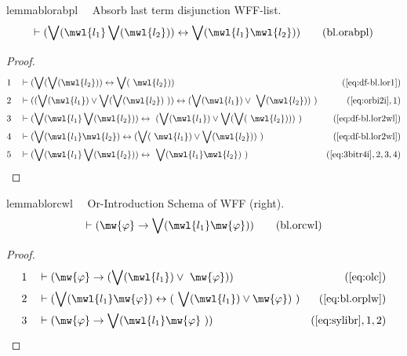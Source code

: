 \begin{restatable}{lemma}{blorabpl}~~ Absorb last term disjunction WFF-list.
\begin{align}
\vdash ( \bigvee( \mwl{l_1} \bigvee( \mwl{l_2} ) ) \leftrightarrow \bigvee(
    \mwl{l_1} \mwl{l_2} ) )\label{eq:bl.orabpl}\tag{bl.orabpl}
\end{align}
\end{restatable}

\begin{proof}
\begin{align}
  1 &&  & \vdash ( \bigvee( \bigvee( \mwl{l_2} ) ) \leftrightarrow \bigvee(
     ~\mwl{l_2} ) )&(\mbox{\ref{eq:df-bl.lor1}})\notag
  \\ 2 &&  & \vdash ( ( \bigvee( \mwl{l_1} ) \vee \bigvee( \bigvee( \mwl{l_2} )
     ~) ) \leftrightarrow ( \bigvee( \mwl{l_1} ) \vee
     ~\bigvee( \mwl{l_2} ) )
     ~)&(\mbox{\ref{eq:orbi2i}},1)\notag
  \\ 3 &&  & \vdash ( \bigvee( \mwl{l_1} \bigvee( \mwl{l_2} ) ) \leftrightarrow
     ~( \bigvee( \mwl{l_1} ) \vee \bigvee( \bigvee(
     ~\mwl{l_2} ) ) )
     ~)&(\mbox{\ref{eq:df-bl.lor2wl}})\notag
  \\ 4 &&  & \vdash ( \bigvee( \mwl{l_1} \mwl{l_2} ) \leftrightarrow ( \bigvee(
     ~\mwl{l_1} ) \vee \bigvee( \mwl{l_2} ) )
     ~)&(\mbox{\ref{eq:df-bl.lor2wl}})\notag
  \\ 5 &&  & \vdash ( \bigvee( \mwl{l_1} \bigvee( \mwl{l_2} ) ) \leftrightarrow
     ~\bigvee( \mwl{l_1} \mwl{l_2} )
     ~)&(\mbox{\ref{eq:3bitr4i}},2,3,4)\notag
\end{align}
\end{proof}

\begin{restatable}{lemma}{blorcwl}~~ Or-Introduction Schema of WFF (right).
\begin{align}
\vdash ( \mw{\varphi} \rightarrow \bigvee( \mwl{l_1} \mw{\varphi} )
    )\label{eq:bl.orcwl}\tag{bl.orcwl}
\end{align}
\end{restatable}

\begin{proof}
\begin{align}
  1 &&  & \vdash ( \mw{\varphi} \rightarrow ( \bigvee( \mwl{l_1} ) \vee
     ~\mw{\varphi} ) )&(\mbox{\ref{eq:olc}})\notag
  \\ 2 &&  & \vdash ( \bigvee( \mwl{l_1} \mw{\varphi} ) \leftrightarrow (
     ~\bigvee( \mwl{l_1} ) \vee \mw{\varphi} )
     ~)&(\mbox{\ref{eq:bl.orplw}})\notag
  \\ 3 &&  & \vdash ( \mw{\varphi} \rightarrow \bigvee( \mwl{l_1} \mw{\varphi}
     ~) )&(\mbox{\ref{eq:sylibr}},1,2)\notag
\end{align}
\end{proof}

